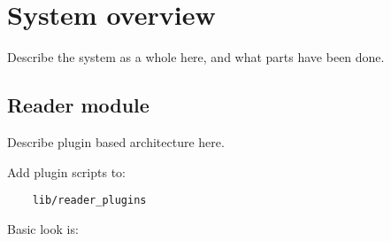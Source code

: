 
\section{System overview}\label{sec:res:sys}

Describe the system as a whole here, and what parts have been done.



%
%


\subsection{Reader module}

Describe plugin based architecture here.

Add plugin scripts to:


\begin{lstlisting}
    lib/reader_plugins
\end{lstlisting}

Basic look is:

